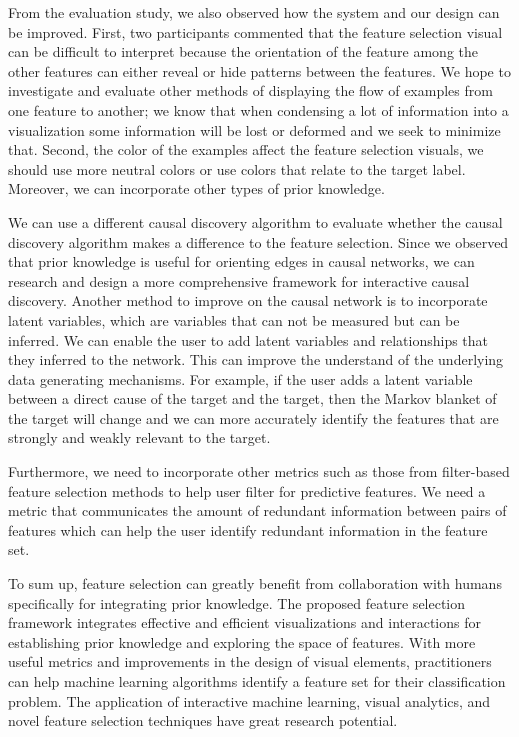 From the evaluation study, we also observed how the system and our design can be improved. First, two participants commented that the feature selection visual can be difficult to interpret because the orientation of the feature among the other features can either reveal or hide patterns between the features. We hope to investigate and evaluate other methods of displaying the flow of examples from one feature to another; we know that when condensing a lot of information into a visualization some information will be lost or deformed and we seek to minimize that. Second, the color of the examples affect the feature selection visuals, we should use more neutral colors or use colors that relate to the target label. Moreover, we can incorporate other types of prior knowledge.

We can use a different causal discovery algorithm to evaluate whether the causal discovery algorithm makes a difference to the feature selection. Since we observed that prior knowledge is useful for orienting edges in causal networks, we can research and design a more comprehensive framework for interactive causal discovery. Another method to improve on the causal network is to incorporate latent variables, which are variables that can not be measured but can be inferred. We can enable the user to add latent variables and relationships that they inferred to the network. This can improve the understand of the underlying data generating mechanisms. For example, if the user adds a latent variable between a direct cause of the target and the target, then the Markov blanket of the target will change and we can more accurately identify the features that are strongly and weakly relevant to the target. 

Furthermore, we need to incorporate other metrics such as those from filter-based feature selection methods to help user filter for predictive features. We need a metric that communicates the amount of redundant information between pairs of features which can help the user identify redundant information in the feature set.

To sum up, feature selection can greatly benefit from collaboration with humans specifically for integrating prior knowledge.  The proposed feature selection framework integrates effective and efficient visualizations and interactions for establishing prior knowledge and exploring the space of features. With more useful metrics and improvements in the design of visual elements, practitioners can help machine learning algorithms identify a feature set for their classification problem.  The application of interactive machine learning, visual analytics, and novel feature selection techniques have great research potential.
